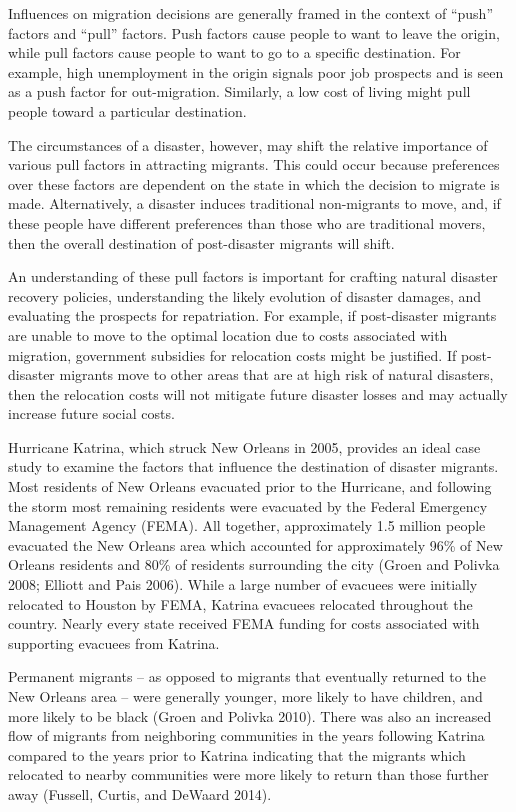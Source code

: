 \documentclass[]{article}
\begin{document}
Influences on migration decisions are generally framed in the context of
``push'' factors and ``pull'' factors. Push factors cause people to want
to leave the origin, while pull factors cause people to want to go to a
specific destination. For example, high unemployment in the origin
signals poor job prospects and is seen as a push factor for
out-migration. Similarly, a low cost of living might pull people toward
a particular destination.

The circumstances of a disaster, however, may shift the relative
importance of various pull factors in attracting migrants. This could
occur because preferences over these factors are dependent on the state
in which the decision to migrate is made. Alternatively, a disaster
induces traditional non-migrants to move, and, if these people have
different preferences than those who are traditional movers, then the
overall destination of post-disaster migrants will shift.

An understanding of these pull factors is important for crafting natural
disaster recovery policies, understanding the likely evolution of
disaster damages, and evaluating the prospects for repatriation. For
example, if post-disaster migrants are unable to move to the optimal
location due to costs associated with migration, government subsidies
for relocation costs might be justified. If post-disaster migrants move
to other areas that are at high risk of natural disasters, then the
relocation costs will not mitigate future disaster losses and may
actually increase future social costs.

Hurricane Katrina, which struck New Orleans in 2005, provides an ideal
case study to examine the factors that influence the destination of
disaster migrants. Most residents of New Orleans evacuated prior to the
Hurricane, and following the storm most remaining residents were
evacuated by the Federal Emergency Management Agency (FEMA). All
together, approximately 1.5 million people evacuated the New Orleans
area which accounted for approximately 96\% of New Orleans residents and
80\% of residents surrounding the city (Groen and Polivka 2008; Elliott
and Pais 2006). While a large number of evacuees were initially
relocated to Houston by FEMA, Katrina evacuees relocated throughout the
country. Nearly every state received FEMA funding for costs associated
with supporting evacuees from Katrina.

Permanent migrants -- as opposed to migrants that eventually returned to
the New Orleans area -- were generally younger, more likely to have
children, and more likely to be black (Groen and Polivka 2010). There
was also an increased flow of migrants from neighboring communities in
the years following Katrina compared to the years prior to Katrina
indicating that the migrants which relocated to nearby communities were
more likely to return than those further away (Fussell, Curtis, and
DeWaard 2014).
\end{document}
